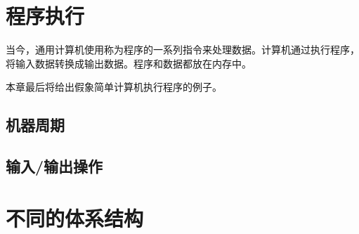\section{程序执行}
当今，通用计算机使用称为程序的一系列指令来处理数据。计算机通过执行程序，将输入数据转换成输出数据。程序和数据都放在内存中。

本章最后将给出假象简单计算机执行程序的例子。
\subsection{机器周期}
\subsection{输入/输出操作}
\section{不同的体系结构}